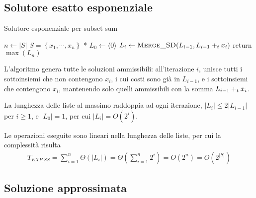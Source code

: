 \subsection{Solutore esatto esponenziale}

\begin{algorithm}[H]
\caption{Solutore esponenziale per subset sum}\label{alg:ss_exp}
\begin{algorithmic}[1]
        \State $n \gets |S|$
        \State * $ S = \left\{ x_1, \cdots, x_n \right\} $ *
        \State $ L_0 \gets \langle 0 \rangle $
            \State $L_i \gets \Call{Merge\_SD}{
                        L_{i-1},
                        L_{i-1} \pt x_i
                    }$
        \EndFor
        \State return $\max (L_n)$
    \EndProcedure
\end{algorithmic}
\end{algorithm}
L'algoritmo genera tutte le soluzioni ammissibili: all'iterazione $i$, unisce tutti i sottoinsiemi che non contengono $x_i$, i cui costi sono già in $L_{i-1}$, e i sottoinsiemi che contengono $x_i$, mantenendo solo quelli ammissibili con la somma $ L_{i-1} +_t x_i $.

La lunghezza delle liste al massimo raddoppia ad ogni iterazione, $|L_i| \leq 2|L_{i-1}|$ per $i\geq 1$, e $|L_0|=1$, per cui $|L_i| = O \left( 2^i \right)$.

Le operazioni eseguite sono lineari nella lunghezza delle liste, per cui la complessità risulta
\begin{align*}
    T_{EXP\_SS} 
    =
    \sum_{i=1}^{n}
    \Theta 
    \left( 
        |L_i|
    \right)
    = 
    \Theta 
    \left( 
        \sum_{i=1}^{n}
        2^i
    \right)
    = O \left( 2^n \right)
    = O \left( 2^{|S|} \right)
\end{align*}

\subsection{Soluzione approssimata}

